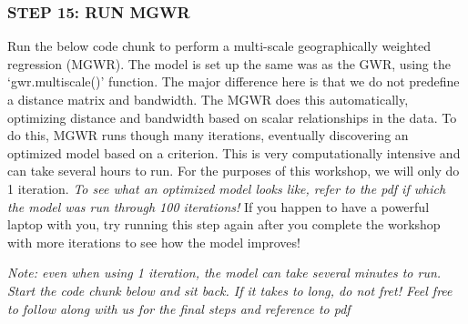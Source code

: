 \documentclass[
  12pt,
]{article}
\begin{document}
\hypertarget{step-15-run-mgwr}{%
\subsubsection{STEP 15: RUN MGWR}\label{step-15-run-mgwr}}

Run the below code chunk to perform a multi-scale geographically
weighted regression (MGWR). The model is set up the same was as the GWR,
using the `gwr.multiscale()' function. The major difference here is that
we do not predefine a distance matrix and bandwidth. The MGWR does this
automatically, optimizing distance and bandwidth based on scalar
relationships in the data. To do this, MGWR runs though many iterations,
eventually discovering an optimized model based on a criterion. This is
very computationally intensive and can take several hours to run. For
the purposes of this workshop, we will only do 1 iteration. \emph{To see
what an optimized model looks like, refer to the pdf if which the model
was run through 100 iterations!} If you happen to have a powerful laptop
with you, try running this step again after you complete the workshop
with more iterations to see how the model improves!

\emph{Note: even when using 1 iteration, the model can take several
minutes to run. Start the code chunk below and sit back. If it takes to
long, do not fret! Feel free to follow along with us for the final steps
and reference to pdf}
\end{document}
